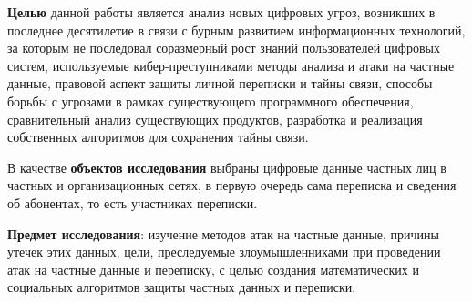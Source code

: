\textbf{Целью} данной работы является %
 анализ новых цифровых угроз, возникших в последнее десятилетие в связи с бурным развитием информационных технологий, за которым не последовал соразмерный рост знаний пользователей цифровых систем, используемые кибер-преступниками методы анализа и атаки на частные данные, правовой аспект защиты личной переписки и тайны связи, способы борьбы с угрозами  в рамках существующего программного обеспечения, %
 сравнительный анализ существующих продуктов, разработка и реализация собственных алгоритмов для сохранения тайны связи. 	
 
 В качестве \textbf{объектов исследования} выбраны цифровые данные частных лиц в частных и организационных сетях, в первую очередь сама  переписка и сведения об абонентах, то есть участниках переписки.
 
 \textbf{Предмет исследования}: изучение методов атак на частные данные, причины утечек этих данных, цели, преследуемые злоумышленниками при проведении атак на частные данные и переписку, с целью создания математических и социальных алгоритмов защиты частных данных и переписки. 
 \newpage %
